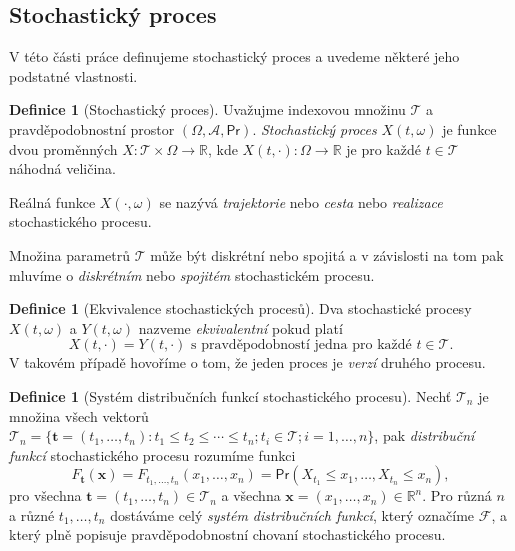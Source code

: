 \documentclass[a4paper,12pt]{report}
\theoremstyle{definition} \newtheorem{definice}[veta]{Definice}
\theoremstyle{remark}
\begin{document}
\subsection{Stochastický proces}
V této části práce definujeme stochastický proces a uvedeme některé jeho podstatné vlastnosti.
\begin{definice}[Stochastický proces]
Uvažujme  indexovou množinu $\mathcal{T}$ a pravděpodobnostní prostor $(\Omega,\mathcal{A}, \mathsf{Pr})$.
\textit{Stochastický proces} $X(t,\omega)$ je funkce dvou proměnných $X:\mathcal{T}\times\Omega\to\mathbb{R}$, kde 
$X(t,\cdot):\Omega\to\mathbb{R}$ je pro každé $t\in\mathcal{T}$ náhodná veličina.

Reálná funkce $X(\cdot,\omega)$ se nazývá \textit{trajektorie} nebo \textit{cesta} nebo \textit{realizace} stochastického procesu. 
\end{definice}
Množina parametrů $\mathcal{T}$ může být diskrétní nebo spojitá a v závislosti na tom pak mluvíme o \textit{diskrétním} nebo \textit{spojitém} stochastickém procesu. 

\begin{definice}[Ekvivalence stochastických procesů]
Dva stochastické procesy $X(t,\omega)$ a $Y(t,\omega)$ nazveme \textit{ekvivalentní} pokud platí
$$X(t,\cdot)=Y(t,\cdot)\text{ s pravděpodobností jedna pro každé }t\in\mathcal{T}.$$ 
V takovém případě hovoříme o tom, že jeden proces je \textit{verzí} druhého procesu.
\end{definice}

\begin{definice}[Systém distribučních funkcí stochastického procesu]
Nechť $\mathcal{T}_n$ je množina všech vektorů $\mathcal{T}_n=\{\boldsymbol{t}=(t_1,\dots,t_n):t_1\leq t_2\leq\cdots\leq t_n; t_i\in\mathcal{T}; i=1,\dots,n\}$,
pak \textit{distribuční funkcí} stochastického procesu rozumíme funkci
$$F_{\boldsymbol{t}}(\boldsymbol{x})=F_{t_1,\dots,t_n}(x_1,\dots,x_n)= \mathsf{Pr}(X_{t_1}\leq x_1,\dots,X_{t_n}\leq x_n),$$
pro všechna $\boldsymbol{t}=(t_1,\dots,t_n)\in \mathcal{T}_n$ a všechna $\boldsymbol{x}=(x_1,\dots,x_n)\in \mathbb{R}^n$.
Pro různá $n$ a různé $t_1,\dots,t_n$ dostáváme celý \textit{systém distribučních funkcí}, který označíme $\mathcal{F}$, a který plně popisuje pravděpodobnostní chovaní stochastického procesu.

\end{definice}
\end{document}
